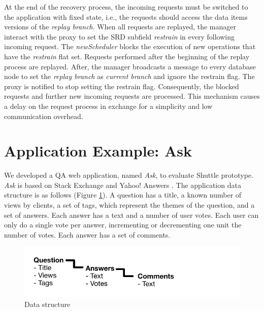 At the end of the recovery process, the incoming requests must be switched to the application with fixed state, i.e., the requests should access the data items versions of the \emph{replay branch}. When all requests are replayed, the manager interact with the proxy to set the \ac{SRD} subfield \emph{restrain} in every following incoming request. The \emph{newScheduler} blocks the execution of new operations that have the \emph{restrain} flat set. Requests performed after the beginning of the replay process are replayed. After, the manager broadcasts a message to every database node to set the \emph{replay branch} as \emph{current branch} and ignore the restrain flag. The proxy is notified to stop setting the restrain flag. Consequently, the blocked requests and further new incoming requests are processed. This mechanism causes a delay on the request process in exchange for a simplicity and low communication overhead. 

\section{Application Example: Ask}\label{sec:impl:application}
We developed a \acf{QA} web application, named \emph{Ask}, to evaluate Shuttle prototype. \emph{Ask} is based on Stack Exchange \cite{stackexchange} and Yahoo! Answers \cite{yahooAnswers}. The application data structure is as follows (Figure \ref{fig:DataStructure}). A question has a title, a known number of views by clients, a set of tags, which represent the themes of the question, and a set of answers. Each answer has a text and a number of user votes. Each user can only do a single vote per answer, incrementing or decrementing one unit the number of votes. Each answer has a set of comments.

 \begin{figure}
   \centering
   \includegraphics{images/questionStructure}
   \caption{Data structure}
   \label{fig:DataStructure}
 \end{figure}

